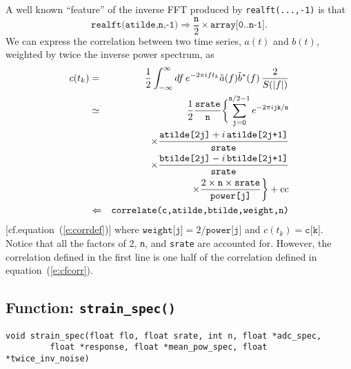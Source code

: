 A well known ``feature'' of the inverse FFT produced by \texttt{realft(...,-1)}
is that
\begin{equation}
  \texttt{realft(atilde,n,-1)} \Rightarrow
    \frac{\texttt{n}}{2}\times\texttt{array[0..n-1]}.
\end{equation}
We can express the correlation between two time series, $a(t)$ and
$b(t)$, weighted by twice the inverse power spectrum, as
\begin{eqnarray}
  c(t_k) &=& \frac{1}{2}\int_{-\infty}^{\infty} df\,e^{-2\pi ift_k}
    \tilde{a}(f)\tilde{b}^\ast(f)\,\frac{2}{S(|f|)} \nonumber\\
  &\simeq& \frac{1}{2}\frac{\texttt{srate}}{\texttt{n}} \biggl\{
    \sum_{\texttt{\scriptsize j}=0}^{\texttt{\scriptsize n}/2-1}
    e^{-2\pi i\texttt{\scriptsize{jk}}/\texttt{\scriptsize n}} \nonumber\\
  & & \qquad
      \times\frac{\texttt{atilde[2j]}+i\,\texttt{atilde[2j+1]}}{\texttt{srate}}
      \nonumber\\
  & & \qquad
      \times\frac{\texttt{btilde[2j]}-i\,\texttt{btilde[2j+1]}}{\texttt{srate}}
      \nonumber\\
  & & \qquad
      \times\frac{2\times\texttt{n}\times\texttt{srate}}{\texttt{power[j]}}
      \biggr\} + {\mathrm{cc}} \nonumber\\
  &\Leftarrow& \texttt{correlate(c,atilde,btilde,weight,n)}
\end{eqnarray}
[cf.\@ equation~(\ref{e:corrdef})]
where $\texttt{weight[j]}=2/\texttt{power[j]}$ and $c(t_k)=\texttt{c[k]}$.
Notice that all the factors of 2, \texttt{n}, and \texttt{srate} are accounted
for.  However, the correlation defined in the first line is one half of the
correlation defined in equation~(\ref{e:cfcorr}).

\clearpage
\subsection{Function: \texttt{strain\_spec()}}
\label{ss:strain_spec}

\begin{verbatim}
void strain_spec(float flo, float srate, int n, float *adc_spec,
		 float *response, float *mean_pow_spec, float *twice_inv_noise)
\end{verbatim}

